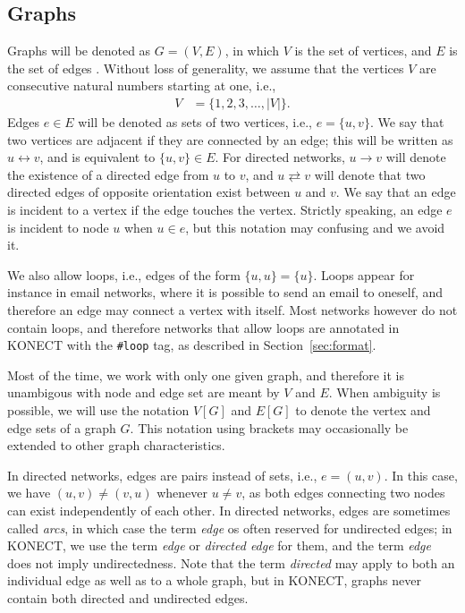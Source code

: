 \documentclass{article}
\begin{document}
\subsection{Graphs}
Graphs will be denoted as $G=(V,E)$, in which $V$ is the set of
vertices, and $E$ is the set of edges \citep{b116}. Without loss of
generality, we assume that the vertices $V$ are consecutive natural
numbers starting at one, i.e.,
\begin{align}
  V &= \{ 1, 2, 3, \dotsc, |V| \}.
\end{align}
Edges $e\in E$ will be denoted as sets of two vertices, i.e.,
$e=\{u,v\}$.  We say that two vertices are adjacent if they are
connected by an edge; this will be written as $u \leftrightarrow v$, and is equivalent to $\{u,v\}\in E$. 
For directed networks, $u \rightarrow v$ will denote the existence of a
directed edge from $u$ to $v$, and $u \rightleftarrows v$ will denote
that two directed edges of opposite orientation exist between $u$ and $v$.
We say that an
edge is incident to a vertex if the edge touches the vertex. Strictly
speaking, an edge $e$ is incident to node $u$ when $u\in e$, but this
notation may confusing and we avoid it. 

We also allow loops, i.e., edges of the form $\{u,u\}=\{u\}$.  Loops
appear for instance in email networks, where it is possible to send an
email to oneself, and therefore an edge may connect a vertex with
itself.  Most networks however do not contain loops, and therefore
networks that allow loops are annotated in KONECT with the 
\texttt{\#loop} tag, as described in Section~\ref{sec:format}. 

Most of the time, we work with only one given graph, and therefore it is
unambigous with node and edge set are meant by $V$ and $E$.  When
ambiguity is possible, we will use the notation
$V[G]$ and $E[G]$ to denote the vertex and edge sets of a graph $G$.
This notation using brackets may occasionally be extended to other graph
characteristics. 

In directed networks, edges are pairs instead of sets, i.e.,
$e=(u,v)$.  In this case, we have $(u,v)\neq(v,u)$ whenever $u \neq v$, 
as both edges connecting two nodes can exist independently of each
other. 
In directed networks, edges are sometimes called
\emph{arcs}, in which case the term \emph{edge} os often reserved for
undirected edges; in KONECT, we use the term \emph{edge} or \emph{directed
  edge} for them, and the term \emph{edge} does not imply
undirectedness.  Note that the term \emph{directed} may apply to both an
individual edge as well as to a whole graph, but in KONECT, graphs never
contain both directed and undirected edges. 
\end{document}
